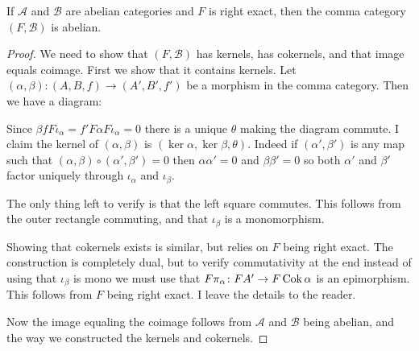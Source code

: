 \begin{prop}\label{prop:comma-cat_abelian}
	If $\mathcal A$ and $\mathcal B$ are abelian categories and $F$ is right exact, then the comma category $(F, \mathcal  B)$ is abelian.
	\begin{proof}
		We need to show that $(F, \mathcal B)$ has kernels, has cokernels, and that image equals coimage. First we show that it contains kernels. Let $(\alpha, \beta)\colon(A, B, f) \to (A', B', f')$ be a morphism in the comma category. Then we have a diagram:
		\begin{center}
		\end{center}
		Since $\beta f F\iota_\alpha = f' F\alpha F \iota_\alpha = 0$ there is a unique $\theta$ making the diagram commute. I claim the kernel of $(\alpha, \beta)$ is $(\ker \alpha, \ker \beta, \theta)$. Indeed if $(\alpha', \beta')$ is any map such that $(\alpha, \beta) \circ (\alpha', \beta') = 0$ then $\alpha\alpha'=0$ and $\beta\beta'=0$ so both $\alpha'$ and $\beta'$ factor uniquely through $\iota_\alpha$ and $\iota_\beta$.
		\begin{center}
		\end{center}
		The only thing left to verify is that the left square commutes. This follows from the outer rectangle commuting, and that $\iota_\beta$ is a monomorphism.
		
		Showing that cokernels exists is similar, but relies on $F$ being right exact. The construction is completely dual, but to verify commutativity at the end instead of using that $\iota_\beta$ is mono we must use that $F\pi_\alpha\colon FA' \to F\operatorname{Cok} \alpha$ is an epimorphism. This follows from $F$ being right exact. I leave the details to the reader. 
		
		Now the image equaling the coimage follows from $\mathcal A$ and $\mathcal B$ being abelian, and the way we constructed the kernels and cokernels.
	\end{proof}
\end{prop}

